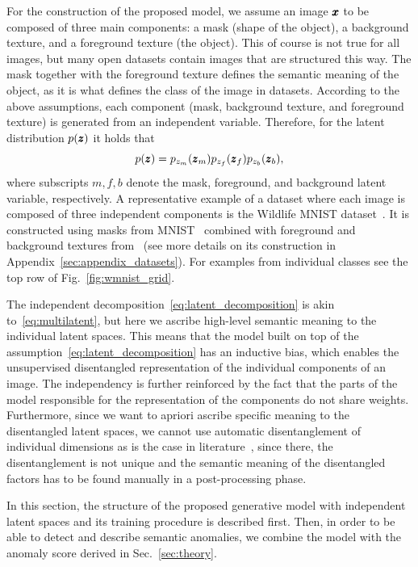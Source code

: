For the construction of the proposed model, we assume an image $\pmb{{x}}$ to be composed of three main components: a mask (shape of the object), a background texture, and a foreground texture (the object). This of course is not true for all images, but many open datasets contain images that are structured this way. The mask together with the foreground texture defines the semantic meaning of the object, as it is what defines the class of the image in datasets. According to the above assumptions, each component (mask, background texture, and foreground texture) is generated from an independent variable. Therefore, for the latent distribution $p(\pmb{{z}})$ it holds that
\begin{equation} \label{eq:latent_decomposition}
     p(\pmb{{z}}) = p_{z_{m}}(\pmb{{z}}_{m})p_{z_{f}}(\pmb{{z}}_{f})p_{z_b}(\pmb{{z}}_{b}),
\end{equation}
where subscripts $m,f,b$ denote the mask, foreground, and background latent variable, respectively. 
A representative example of a dataset where each image is composed of three independent components is the Wildlife MNIST dataset~\cite{sauer2021counterfactual}. It is constructed using masks from MNIST~\cite{lecun2010mnist} combined with foreground and background textures from~\cite{cimpoi2014describing} (see more details on its construction in Appendix~\ref{sec:appendix_datasets}). For examples from individual classes see the top row of Fig.~\ref{fig:wmnist_grid}. 

The independent decomposition~\eqref{eq:latent_decomposition} is akin to~\eqref{eq:multilatent}, but here we ascribe high-level semantic meaning to the individual latent spaces. This means that the model built on top of the assumption~\eqref{eq:latent_decomposition} has an inductive bias, which enables the unsupervised disentangled representation of the individual components of an image. The independency is further reinforced by the fact that the parts of the model responsible for the representation of the components do not share weights. Furthermore, since we want to apriori ascribe specific meaning to the disentangled latent spaces, we cannot use automatic disentanglement of individual dimensions as is the case in literature~\cite{burgess2018understanding, kim2019bayes, deecke2021transfer}, since there, the disentanglement is not unique and the semantic meaning of the disentangled factors has to be found manually in a post-processing phase.

In this section, the structure of the proposed generative model with independent latent spaces and its training procedure is described first. Then, in order to be able to detect and describe semantic anomalies, we combine the model with the anomaly score derived in Sec.~\ref{sec:theory}.

